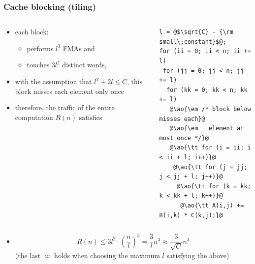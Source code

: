 \documentclass[12pt,dvipdfmx]{beamer}
\newcommand{\ao}[1]{{\color{blue}#1}}
\begin{document}
\begin{frame}[fragile]
  \frametitle{Cache blocking (tiling)}
\begin{columns}
\begin{column}{0.55\textwidth}
\begin{itemize}
\item<1-> each block:
  \begin{itemize}
  \item performs \ao{$l^3$} FMAs and
  \item touches \ao{$3l^2$} distinct words,
  \end{itemize}
\item<2-> with the assumption that $l^2 + 2l \leq C$, this block misses each element only once
  
\item<3-> therefore, the traffic of the entire computation $R(n)$ satisfies

\end{itemize}
\end{column}

\begin{column}{0.45\textwidth}
\begin{lstlisting}
l = @$\sqrt{C} - {\rm small\;constant}$@;
for (ii = 0; ii < n; ii += l)
 for (jj = 0; jj < n; jj += l)
  for (kk = 0; kk < n; kk += l)
   @\ao{\em /* block below misses each}@
   @\ao{\em   element at most once */}@
   @\ao{\tt for (i = ii; i < ii + l; i++)}@
    @\ao{\tt for (j = jj; j < jj + l; j++)}@
     @\ao{\tt for (k = kk; k < kk + l; k++)}@
      @\ao{\tt A(i,j) += B(i,k) * C(k,j);}@
\end{lstlisting}
\end{column}
\end{columns}

\begin{itemize}
\item<3->[]
  \[ R(n) \leq 3l^2 \cdot \left(\frac{n}{l}\right)^3 = \frac{3}{l}n^3 \approx \frac{3}{\sqrt{C}}n^3  \]
  (the last $\approx$ holds when choosing the maximum $l$ satisfying the above)
\end{itemize}


\end{frame}

\end{document}
